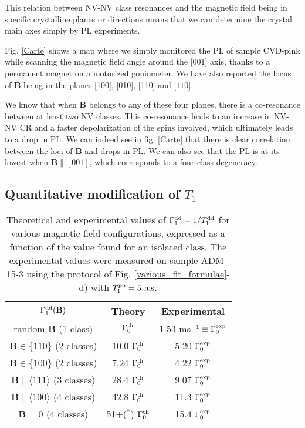 \documentclass[a4paper,11pt]{report}
\begin{document}
\begin{refsection}
This relation between NV-NV class resonances and the magnetic field being in specific crystalline planes or directions means that we can determine the crystal main axes simply by PL experiments.

Fig. \ref{Carte} shows a map where we simply monitored the PL of sample CVD-pink while scanning the magnetic field angle around the [001] axis, thanks to a permanent magnet on a motorized goniometer. We have also reported the locus of $\mathbf{B}$ being in the planes [100], [010], [110] and [$1\bar 1 0$].

We know that when $\mathbf{B}$ belongs to any of these four planes, there is a co-resonance between at least two NV classes. This co-resonance leads to an increase in NV-NV CR and a faster depolarization of the spins involved, which ultimately leads to a drop in PL. We can indeed see in fig. \ref{Carte} that there is clear correlation between the loci of $\mathbf{B}$ and drops in PL. We can also see that the PL is at its lowest when $\mathbf{B}\parallel [001]$, which corresponds to a four class degeneracy.

\subsection{Quantitative modification of $T_1$}
\label{sec quantitative T1}
\begin{table}[htbp]
\centering
\caption{Theoretical and experimental values of $\Gamma_1^{\rm dd}=1/T_1^{\rm dd}$ for various magnetic field configurations, expressed as a function of the value found for an isolated class. The experimental values were measured on sample ADM-15-3 using the protocol of Fig. \ref{various_fit_formulae}-d) with $T_1^{\rm ph}= 5\ \rm ms$.}
 \label{T1 champ mag}
\begin{tabular}{c|cc}
\toprule
$\Gamma_1^{\rm dd} (\mathbf{B})$ &  Theory & Experimental \\
\midrule
random $\mathbf{B}$ (1 class) & $\Gamma_0^{\rm th}$ & 1.53 ms$^{-1} \equiv \Gamma_0^{\rm exp}$ \\
$\mathbf{B} \in \{110\}$ (2 classes) & 10.0 $\Gamma_0^{\rm th}$ & 5.20 $\Gamma_0^{\rm exp}$ \\
$\mathbf{B} \in \{100\}$ (2 classes) & 7.24 $\Gamma_0^{\rm th}$ & 4.22 $\Gamma_0^{\rm exp}$ \\
$\mathbf{B} \parallel \langle 111 \rangle$ (3 classes) & 28.4 $\Gamma_0^{\rm th}$ & 9.07 $\Gamma_0^{\rm exp}$ \\
$\mathbf{B} \parallel \langle 100 \rangle$ (4 classes) & 42.8 $\Gamma_0^{\rm th}$ & 11.3 $\Gamma_0^{\rm exp}$ \\
$\mathbf{B}=0$ (4 classes) & 51+($^*$) $\Gamma_0^{\rm th}$ & 15.4 $\Gamma_0^{\rm exp}$ \\
\bottomrule
\end{tabular}


\end{table}
\end{refsection}
\end{document}
